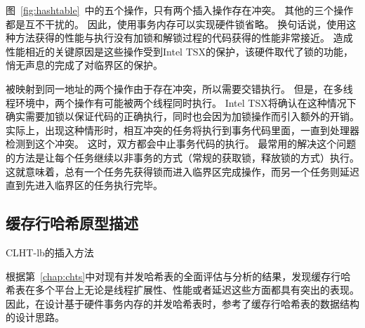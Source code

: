 图~\ref{fig:hashtable}~中的五个操作，只有两个插入操作存在冲突。
其他的三个操作都是互不干扰的。
因此，使用事务内存可以实现硬件锁省略。
换句话说，使用这种方法获得的性能与执行没有加锁和解锁过程的代码获得的性能非常接近。
造成性能相近的关键原因是这些操作受到Intel TSX的保护，该硬件取代了锁的功能，悄无声息的完成了对临界区的保护。

被映射到同一地址的两个操作由于存在冲突，所以需要交错执行。
但是，在多线程环境中，两个操作有可能被两个线程同时执行。
Intel TSX将确认在这种情况下确实需要加锁以保证代码的正确执行，同时也会因为加锁操作而引入额外的开销。
实际上，出现这种情形时，相互冲突的任务将执行到事务代码里面，一直到处理器检测到这个冲突。
这时，双方都会中止事务代码的执行。
最常用的解决这个问题的方法是让每个任务继续以非事务的方式（常规的获取锁，释放锁的方式）执行。
这就意味着，总有一个任务先获得锁而进入临界区完成操作，而另一个任务则延迟直到先进入临界区的任务执行完毕。


\subsection{缓存行哈希原型描述}

\begin{algorithm}[htbp]
\SetAlgoLined
{}%
%
\caption{CLHT-lb的插入方法}
\label{algo:clht-lb-insert}
\end{algorithm}

根据第~\ref{chap:chts}中对现有并发哈希表的全面评估与分析的结果，发现缓存行哈希表在多个平台上无论是线程扩展性、性能或者延迟这些方面都具有突出的表现。
因此，在设计基于硬件事务内存的并发哈希表时，参考了缓存行哈希表的数据结构的设计思路。

